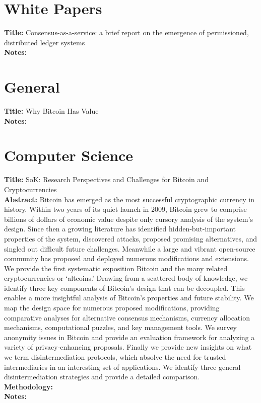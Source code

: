 \documentclass[a4paper, 12pt]{scrartcl}
\begin{document}
\section{White Papers}

\textbf{Title:} Consensus-as-a-service: a brief report on the emergence of permissioned, distributed ledger systems \parencite{swansonconsensus} \\
\textbf{Notes:} 

\section{General}

\textbf{Title:} Why Bitcoin Has Value \parencite{VanAlstyne:2014:WBV:2594413.2594288} \\
\textbf{Notes:} 

\section{Computer Science}

\textbf{Title:} SoK: Research Perspectives and Challenges for Bitcoin and Cryptocurrencies \parencite{bonneau2015sok} \\
\textbf{Abstract:} Bitcoin has emerged as the most successful cryptographic
currency in history. Within two years of its quiet launch
in 2009, Bitcoin grew to comprise billions of dollars of economic
value despite only cursory analysis of the system’s design. Since
then a growing literature has identified hidden-but-important
properties of the system, discovered attacks, proposed promising
alternatives, and singled out difficult future challenges.
Meanwhile a large and vibrant open-source community has
proposed and deployed numerous modifications and extensions.
We provide the first systematic exposition Bitcoin and the
many related cryptocurrencies or ‘altcoins.’ Drawing from a
scattered body of knowledge, we identify three key components
of Bitcoin’s design that can be decoupled. This enables a more
insightful analysis of Bitcoin’s properties and future stability.
We map the design space for numerous proposed modifications,
providing comparative analyses for alternative consensus
mechanisms, currency allocation mechanisms, computational
puzzles, and key management tools. We survey anonymity
issues in Bitcoin and provide an evaluation framework for
analyzing a variety of privacy-enhancing proposals. Finally
we provide new insights on what we term disintermediation
protocols, which absolve the need for trusted intermediaries
in an interesting set of applications. We identify three general
disintermediation strategies and provide a detailed comparison.\\
\textbf{Methodology:} \\
\textbf{Notes:}
\end{document}
